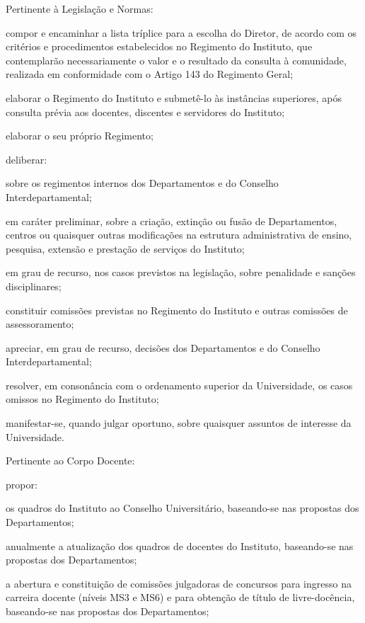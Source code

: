 \documentclass{documento}
\begin{document}
\inciso Pertinente à Legislação e Normas:

\subinciso compor e encaminhar a lista tríplice para a escolha do Diretor, de acordo com os critérios e procedimentos estabelecidos no Regimento do Instituto, que contemplarão necessariamente o valor e o resultado da consulta à comunidade, realizada em conformidade com o Artigo 143 do Regimento Geral;
    
\subinciso elaborar o Regimento do Instituto e submetê-lo às instâncias superiores, após consulta prévia aos docentes, discentes e servidores do Instituto;

\subinciso elaborar o seu próprio Regimento;
    
\subinciso deliberar:

\subsubinciso sobre os regimentos internos dos Departamentos e do Conselho Interdepartamental;
        
\subsubinciso em caráter preliminar, sobre a criação, extinção ou fusão de Departamentos, centros ou quaisquer outras modificações na estrutura administrativa de ensino, pesquisa, extensão e prestação de serviços do Instituto;
        
\subsubinciso em grau de recurso, nos casos previstos na legislação, sobre penalidade e sanções disciplinares;
    
\subinciso constituir comissões previstas no Regimento do Instituto e outras comissões de assessoramento;
    
\subinciso apreciar, em grau de recurso, decisões dos Departamentos e do Conselho Interdepartamental;
    
\subinciso resolver, em consonância com o ordenamento superior da Universidade, os casos omissos no Regimento do Instituto;
    
\subinciso manifestar-se, quando julgar oportuno, sobre quaisquer assuntos de interesse da Universidade.

\inciso Pertinente ao Corpo Docente:

\subinciso propor:

\subsubinciso os quadros do Instituto ao Conselho Universitário, baseando-se nas propostas dos Departamentos;

\subsubinciso anualmente a atualização dos quadros de docentes do Instituto, baseando-se nas propostas dos Departamentos;

\subsubinciso a abertura e constituição de comissões julgadoras de concursos para ingresso na carreira docente (níveis MS3 e MS6) e para obtenção de título de livre-docência, baseando-se nas propostas dos Departamentos;
\end{document}
